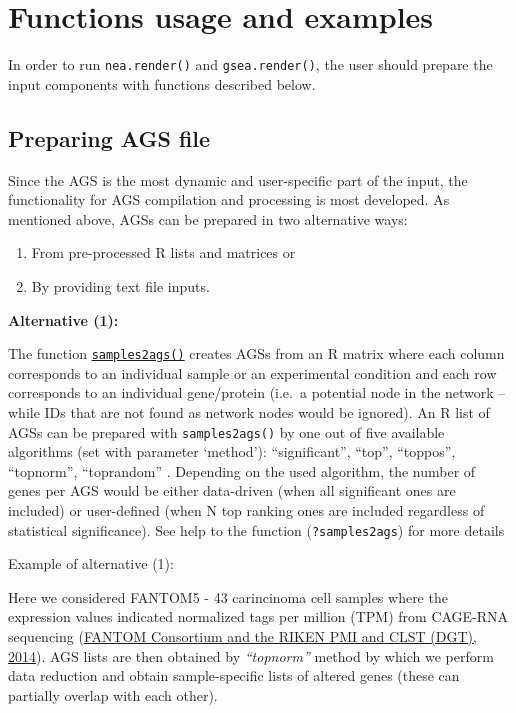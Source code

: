 \documentclass[]{article}
\providecommand{\tightlist}{%
  \setlength{\itemsep}{0pt}\setlength{\parskip}{0pt}}
\begin{document}
\hypertarget{test4}{\section{Functions usage and examples}\label{test4}}

In order to run \texttt{nea.render()} and \texttt{gsea.render()}, the
user should prepare the input components with functions described below.

\hypertarget{ags}{\subsection{Preparing AGS file}\label{ags}}

Since the AGS is the most dynamic and user-specific part of the input,
the functionality for AGS compilation and processing is most developed.
As mentioned above, AGSs can be prepared in two alternative ways:

\begin{enumerate}
\def\labelenumi{\arabic{enumi})}
\tightlist
\item
  From pre-processed R lists and matrices or
\item
  By providing text file inputs.
\end{enumerate}

\textbf{Alternative (1):}

The function \protect\hyperlink{s2g}{\texttt{samples2ags()}} creates
AGSs from an R matrix where each column corresponds to an individual
sample or an experimental condition and each row corresponds to an
individual gene/protein (i.e.~a potential node in the network -- while
IDs that are not found as network nodes would be ignored). An R list of
AGSs can be prepared with \texttt{samples2ags()} by one out of five
available algorithms (set with parameter `method'): ``significant'',
``top'', ``toppos'', ``topnorm'', ``toprandom'' . Depending on the used
algorithm, the number of genes per AGS would be either data-driven (when
all significant ones are included) or user-defined (when N top ranking
ones are included regardless of statistical significance). See help to
the function (\texttt{?samples2ags}) for more details

Example of alternative (1):

Here we considered FANTOM5 - 43 carincinoma cell samples where the
expression values indicated normalized tags per million (TPM) from
CAGE-RNA sequencing
(\href{http://www.ncbi.nlm.nih.gov/pubmed/24670764}{FANTOM Consortium
and the RIKEN PMI and CLST (DGT), 2014}). AGS lists are then obtained by
\emph{``topnorm''} method by which we perform data reduction and obtain
sample-specific lists of altered genes (these can partially overlap with
each other).
\end{document}
